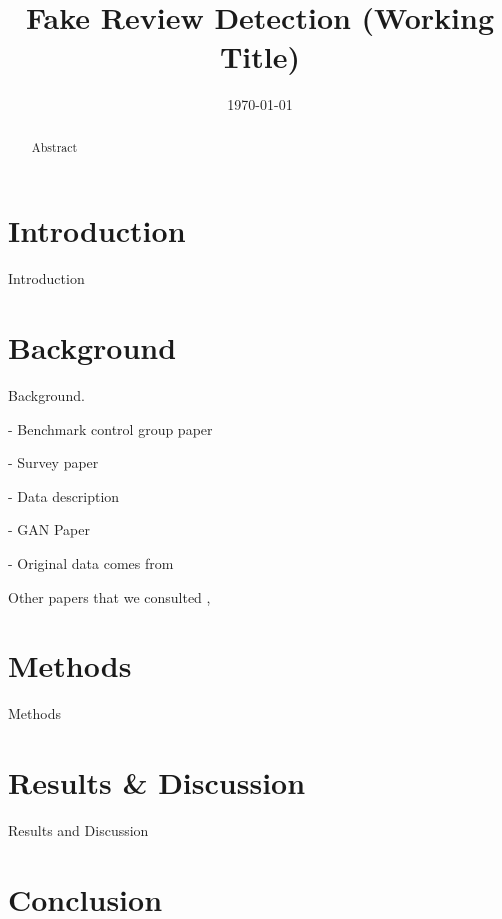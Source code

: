 \documentclass[conference]{IEEEtran} %
\title{Fake Review Detection (Working Title)}
\date{\today}
\author{\IEEEauthorblockN{Satheesh Joseph}
\and
\IEEEauthorblockN{Catherine Mou}
\and
\IEEEauthorblockN{Yi Zhang}
}
\theoremstyle{plain}
\theoremstyle{definition}
\begin{document}
\maketitle



\begin{abstract}
Abstract
\end{abstract}

\section{Introduction}
\label{intro}

Introduction

\section{Background}
\label{bg}

Background.

- Benchmark control group paper \cite{Tang2020}

- Survey paper \cite{Mohawesh2021}

- Data description \cite{wang2017handling}

- GAN Paper \cite{stanton2019gans}

- Original data comes from \cite{mukherjee2013fake} \cite{mukherjee2013yelp}

Other papers that we consulted \cite{wang2020fake}, \cite{yuan2019learning}

\section{Methods}
\label{methods}

Methods

\section{Results \& Discussion}
\label{results}

Results and Discussion

\section{Conclusion}
\label{conclusion}
\end{document}
